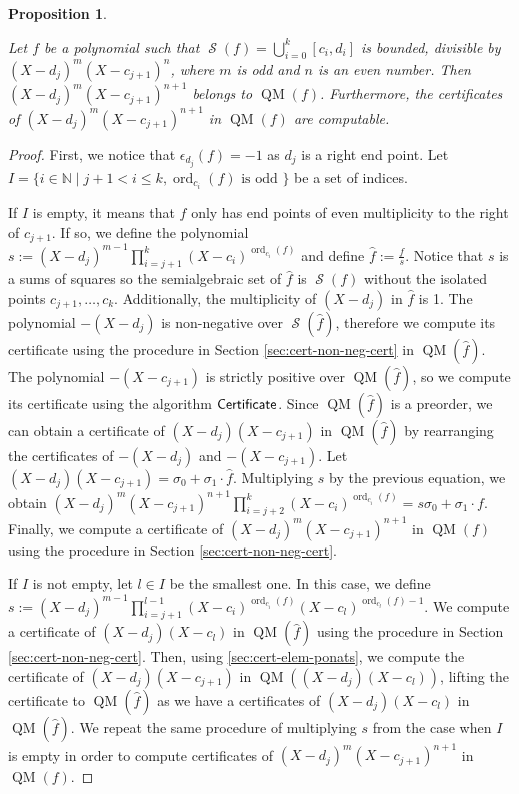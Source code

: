 \documentclass[preprint,12pt,authoryear]{elsarticle}
\newtheorem{proposition}[theorem]{Proposition}
\newtheorem{proof}[theorem]{Proof}
\DeclareMathOperator{\quadmod}{QM}
\DeclareMathOperator{\semialgebraic}{\mathcal{S}}
\DeclareMathOperator{\ord}{ord}
\DeclareMathOperator{\algPutinar}{\sf Certificate}
\begin{document}
\begin{proposition}
  \th\label{sec:addit-constr-from-3}

  Let $f$ be a polynomial such that
  $\semialgebraic(f) = \bigcup_{i=0}^{k}{[c_i, d_i]}$ is bounded, divisible by
 $(X - d_j)^{m}(X - c_{j+1})^{n}$, where $m$ is odd and $n$ is an even
  number. Then $(X - d_j)^{m}(X - c_{j+1})^{n + 1}$ belongs to
  $\quadmod(f)$. Furthermore, the certificates of
  $(X - d_j)^{m}(X - c_{j+1})^{n+1}$ in $\quadmod(f)$ are computable.
\end{proposition}

\begin{proof} First, we notice that $\epsilon_{d_j}(f) = -1$ as $d_j$ is a right
  end point. Let
  $I = \{i \in \mathbb{N} \mid j + 1 < i \leq k, \ord_{c_i}(f) \text{ is odd }
  \}$ be a set of indices.

  If $I$ is empty, it means that $f$ only has end points of even multiplicity to
  the right of $c_{j+1}$. If so, we define the polynomial
  $s := (X - d_j)^{m-1}\prod_{i=j+1}^{k}{(X - c_i)^{\ord_{c_i}(f)}}$ and define
  $\hat{f} := \frac{f}{s}$. Notice that $s$ is a sums of squares so the
  semialgebraic set of $\hat{f}$ is $\semialgebraic(f)$ without the isolated
  points $c_{j+1}, \dots, c_k$. Additionally, the multiplicity of $(X - d_j)$ in
  $\hat{f}$ is 1. The polynomial $-(X - d_j)$ is non-negative over
  $\semialgebraic(\hat{f})$, therefore we compute its certificate using the
  procedure in Section \ref{sec:cert-non-neg-cert} in $\quadmod(\hat{f})$. The
  polynomial $-(X - c_{j+1})$ is strictly positive over $\quadmod(\hat{f})$, so
  we compute its certificate using the algorithm $\algPutinar$. Since
  $\quadmod(\hat{f})$ is a preorder, we can obtain a certificate of
  $(X - d_j)(X - c_{j+1})$ in $\quadmod(\hat{f})$ by rearranging the
  certificates of $-(X - d_j)$ and $-(X - c_{j+1})$. Let
  $(X - d_j)(X - c_{j+1}) = \sigma_0 + \sigma_1 \cdot \hat{f}$. Multiplying $s$
 by the previous equation, we obtain
  $(X - d_j)^{m}(X - c_{j+1})^{n+1} \prod_{i=j+2}^{k}{(X - c_i)}^{\ord_{c_i}(f)}
  = s \sigma_0 + \sigma_1 \cdot f$. Finally, we compute a certificate of
  $(X - d_j)^{m}(X - c_{j+1})^{n+1}$ in $\quadmod(f)$ using the procedure in
  Section \ref{sec:cert-non-neg-cert}.

  If $I$ is not empty, let $l \in I$ be the smallest one. In this case, we
  define
  $s := (X-d_j)^{m-1} \prod_{i=j+1}^{l-1}{(X - c_i)^{\ord_{c_i}(f)}}(X -
  c_l)^{\ord_{c_l}(f)-1}$. We compute a certificate of $(X - d_j)(X - c_l)$ in
  $\quadmod(\hat{f})$ using the procedure in Section
  \ref{sec:cert-non-neg-cert}. Then, using \th\ref{sec:cert-elem-ponats}, we
  compute the certificate of $(X - d_j)(X - c_{j+1})$ in $\quadmod((X - d_j)(X -
  c_l))$, lifting the certificate to $\quadmod(\hat{f})$ as we have a certificates
  of $(X - d_j)(X - c_l)$ in $\quadmod(\hat{f})$. We repeat the same procedure
  of multiplying $s$ from the case when $I$ is empty in order to compute
  certificates of $(X - d_j)^{m}(X - c_{j+1})^{n+1}$ in $\quadmod(f)$.
\end{proof}
\end{document}
